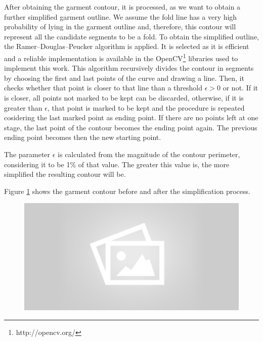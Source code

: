 After obtaining the garment contour, it is processed, as we want to obtain a further simplified garment outline. We assume the fold line has a very high probability of lying in the garment outline and, therefore, this contour will represent all the candidate segments to be a fold. To obtain the simplified outline, the Ramer–Douglas–Peucker algorithm  is applied. It is selected as it is efficient and a reliable implementation is available in the OpenCV\footnote{http://opencv.org/} libraries used to implement this work. This algorithm recursively divides the contour in segments by choosing the first and last points of the curve and drawing a line. Then, it checks whether that point is closer to that line than a threshold $\epsilon > 0$ or not. If it is closer, all points not marked to be kept can be discarded, otherwise, if it is greater than $\epsilon$, that point is marked to be kept and the procedure is repeated cosidering the last marked point as ending point. If there are no points left at one stage, the last point of the contour becomes the ending point again. The previous ending point becomes then the new starting point.

The parameter $\epsilon$ is calculated from the magnitude of the contour perimeter, considering it to be 1\% of that value. The greater this value is, the more simplified the resulting contour will be.

Figure \ref{fig:contour_and_simplified_contour} shows the garment contour before and after the simplification process.

\begin{figure}[thpb]
    \centering
    \includegraphics[width=0.9
    \textwidth]{figures/placeholder2.png}
    \caption{}
    \label{fig:contour_and_simplified_contour}
\end{figure}

